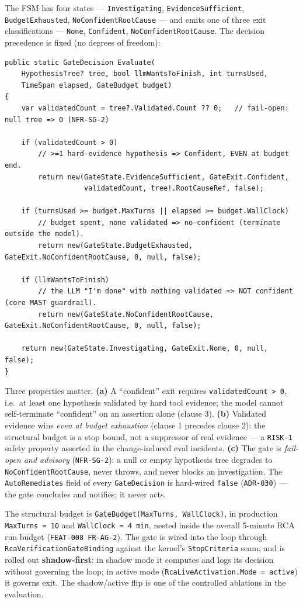 \documentclass[11pt]{article}
\begin{document}
The FSM has four states --- \texttt{Investigating},
\texttt{EvidenceSufficient}, \texttt{BudgetExhausted},
\texttt{NoConfidentRootCause} --- and emits one of three exit classifications
--- \texttt{None}, \texttt{Confident}, \texttt{NoConfidentRootCause}. The
decision precedence is fixed (no degrees of freedom):

\begin{verbatim}
public static GateDecision Evaluate(
    HypothesisTree? tree, bool llmWantsToFinish, int turnsUsed,
    TimeSpan elapsed, GateBudget budget)
{
    var validatedCount = tree?.Validated.Count ?? 0;   // fail-open: null tree => 0 (NFR-SG-2)

    if (validatedCount > 0)
        // >=1 hard-evidence hypothesis => Confident, EVEN at budget end.
        return new(GateState.EvidenceSufficient, GateExit.Confident,
                   validatedCount, tree!.RootCauseRef, false);

    if (turnsUsed >= budget.MaxTurns || elapsed >= budget.WallClock)
        // budget spent, none validated => no-confident (terminate outside the model).
        return new(GateState.BudgetExhausted, GateExit.NoConfidentRootCause, 0, null, false);

    if (llmWantsToFinish)
        // the LLM "I'm done" with nothing validated => NOT confident (core MAST guardrail).
        return new(GateState.NoConfidentRootCause, GateExit.NoConfidentRootCause, 0, null, false);

    return new(GateState.Investigating, GateExit.None, 0, null, false);
}
\end{verbatim}

Three properties matter. \textbf{(a)} A ``confident'' exit requires
\texttt{validatedCount > 0}, i.e.\ at least one hypothesis validated by hard
tool evidence; the model cannot self-terminate ``confident'' on an assertion
alone (clause 3). \textbf{(b)} Validated evidence wins \emph{even at budget
exhaustion} (clause 1 precedes clause 2): the structural budget is a stop
bound, not a suppressor of real evidence --- a \texttt{RISK-1} safety property
asserted in the change-induced eval incidents. \textbf{(c)} The gate is
\emph{fail-open and advisory} (\texttt{NFR-SG-2}): a null or empty hypothesis
tree degrades to \texttt{NoConfidentRootCause}, never throws, and never blocks
an investigation. The \texttt{AutoRemediates} field of every
\texttt{GateDecision} is hard-wired \texttt{false} (\texttt{ADR-030}) --- the
gate concludes and notifies; it never acts.

The structural budget is \texttt{GateBudget(MaxTurns, WallClock)}, in
production \texttt{MaxTurns = 10} and \texttt{WallClock = 4\,min}, nested
inside the overall 5-minute RCA run budget (\texttt{FEAT-008 FR-AG-2}). The
gate is wired into the loop through \texttt{RcaVerificationGateBinding}
against the kernel's \texttt{StopCriteria} seam, and is rolled out
\textbf{shadow-first}: in shadow mode it computes and logs its decision
without governing the loop; in active mode
(\texttt{RcaLiveActivation.Mode = active}) it governs exit. The shadow/active
flip is one of the controlled ablations in the evaluation.
\end{document}
